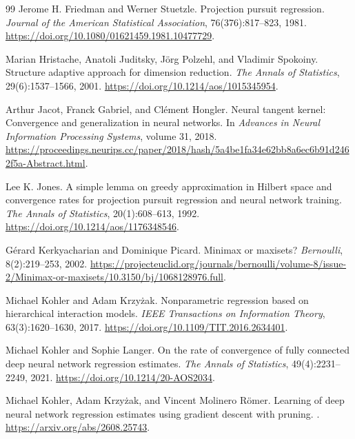 \documentclass[11pt,twoside]{article}
\theoremstyle{definition}
\theoremstyle{remark}
\begin{document}
\begin{thebibliography}{99}
Jerome H. Friedman and Werner Stuetzle.
\newblock Projection pursuit regression.
\newblock \emph{Journal of the American Statistical Association},
76(376):817--823, 1981.
\newblock \url{https://doi.org/10.1080/01621459.1981.10477729}.

Marian Hristache, Anatoli Juditsky, J\"org Polzehl, and Vladimir Spokoiny.
\newblock Structure adaptive approach for dimension reduction.
\newblock \emph{The Annals of Statistics}, 29(6):1537--1566, 2001.
\newblock \url{https://doi.org/10.1214/aos/1015345954}.

Arthur Jacot, Franck Gabriel, and Cl\'ement Hongler.
\newblock Neural tangent kernel: Convergence and generalization in neural
networks.
\newblock In \emph{Advances in Neural Information Processing Systems},
volume 31, 2018.
\newblock
\url{https://proceedings.neurips.cc/paper/2018/hash/5a4be1fa34e62bb8a6ec6b91d2462f5a-Abstract.html}.

Lee K. Jones.
\newblock A simple lemma on greedy approximation in Hilbert space and
convergence rates for projection pursuit regression and neural network
training.
\newblock \emph{The Annals of Statistics}, 20(1):608--613, 1992.
\newblock \url{https://doi.org/10.1214/aos/1176348546}.

G\'erard Kerkyacharian and Dominique Picard.
\newblock Minimax or maxisets?
\newblock \emph{Bernoulli}, 8(2):219--253, 2002.
\newblock \url{https://projecteuclid.org/journals/bernoulli/volume-8/issue-2/Minimax-or-maxisets/10.3150/bj/1068128976.full}.

Michael Kohler and Adam Krzy\.{z}ak.
\newblock Nonparametric regression based on hierarchical interaction models.
\newblock \emph{IEEE Transactions on Information Theory}, 63(3):1620--1630,
2017.
\newblock \url{https://doi.org/10.1109/TIT.2016.2634401}.

Michael Kohler and Sophie Langer.
\newblock On the rate of convergence of fully connected deep neural network
regression estimates.
\newblock \emph{The Annals of Statistics}, 49(4):2231--2249, 2021.
\newblock \url{https://doi.org/10.1214/20-AOS2034}.

Michael Kohler, Adam Krzy\.{z}ak, and Vincent Molinero R\"omer.
\newblock Learning of deep neural network regression estimates using gradient
descent with pruning.
.
\newblock \url{https://arxiv.org/abs/2608.25743}.


\end{thebibliography}
\end{document}
